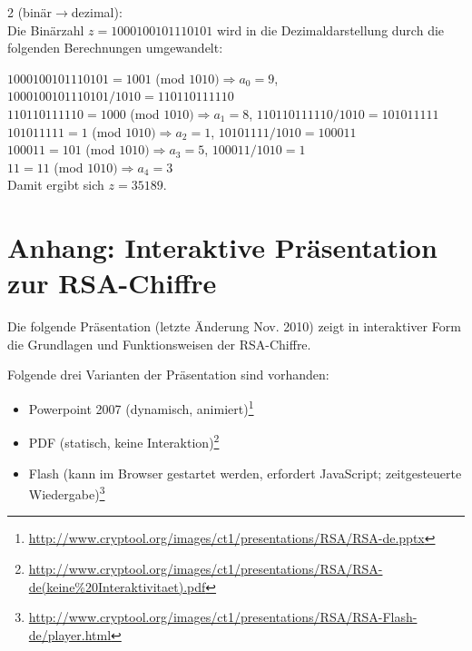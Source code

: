 \begin{refsegment}
\begin{example}{ 2 (binär$\rightarrow$dezimal):}\\
Die Binärzahl $z = 1000100101110101$ wird in die Dezimaldarstellung durch
die folgenden Berechnungen umgewandelt:

 $1000100101110101 = 1001$ (mod $1010)  \Longrightarrow a_0 = 9$, ~ ~ $1000100101110101 / 1010 = 110110111110$\\
$110110111110 = 1000$ (mod $1010) \Longrightarrow a_1 = 8$, $110110111110 / 1010 = 101011111$\\
$101011111 = 1$ (mod $1010) \Longrightarrow a_2 = 1$, $10101111 / 1010 = 100011$\\
$100011 =  101$ (mod $1010) \Longrightarrow a_3 = 5$, $100011 / 1010 = 1$\\
$11 = 11$ (mod $1010) \Longrightarrow a_4 = 3$\\
Damit ergibt sich $z = 35189$.
\end{example}



\hypertarget{NumberTheory_Appendix_D2_Koblenz}{}
\section{Anhang: Interaktive Präsentation zur RSA-Chiffre}
\label{l:NumberTheory_Appendix_D2_Koblenz}{}

Die folgende Präsentation (letzte Änderung Nov. 2010) zeigt in interaktiver
Form die Grundlagen und Funktionsweisen der RSA-Chiffre.

 Folgende drei Varianten der Präsentation sind vorhanden:
\begin{itemize}
 \item Powerpoint 2007 (dynamisch, animiert)\footnote{%
    \url{http://www.cryptool.org/images/ct1/presentations/RSA/RSA-de.pptx}}
 \item PDF (statisch, keine Interaktion)\footnote{%
    \url{http://www.cryptool.org/images/ct1/presentations/RSA/RSA-de(keine%20Interaktivitaet).pdf}}
 \item Flash (kann im Browser gestartet werden, erfordert JavaScript; zeitgesteuerte Wiedergabe)\footnote{%
\url{http://www.cryptool.org/images/ct1/presentations/RSA/RSA-Flash-de/player.html}}
\end{itemize}


\end{refsegment}
